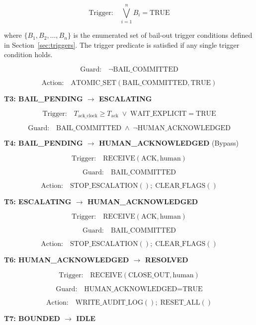 \[
\text{Trigger:} \quad \bigvee_{i=1}^{n} B_i = \text{TRUE}
\]

where $\{B_1, B_2, \ldots, B_n\}$ is the enumerated set of bail-out trigger conditions defined in Section~\ref{sec:triggers}. The trigger predicate is satisfied if any single trigger condition holds.

\[
\text{Guard:} \quad \neg\text{BAIL\_COMMITTED}
\]

\[
\text{Action:} \quad \text{ATOMIC\_SET}(\text{BAIL\_COMMITTED}, \text{TRUE})
\]

\bigskip

\noindent\textbf{T3: BAIL\_PENDING $\rightarrow$ ESCALATING}

\[
\text{Trigger:} \quad T_{\text{ack\_clock}} \geq T_{\text{ack}} \;\lor\; \text{WAIT\_EXPLICIT} = \text{TRUE}
\]

\[
\text{Guard:} \quad \text{BAIL\_COMMITTED} \;\land\; \neg\text{HUMAN\_ACKNOWLEDGED}
\]

\bigskip

\noindent\textbf{T4: BAIL\_PENDING $\rightarrow$ HUMAN\_ACKNOWLEDGED} (Bypass)

\[
\text{Trigger:} \quad \text{RECEIVE}(\text{ACK}, \text{human})
\]

\[
\text{Guard:} \quad \text{BAIL\_COMMITTED}
\]

\[
\text{Action:} \quad \text{STOP\_ESCALATION}(); \; \text{CLEAR\_FLAGS}()
\]

\bigskip

\noindent\textbf{T5: ESCALATING $\rightarrow$ HUMAN\_ACKNOWLEDGED}

\[
\text{Trigger:} \quad \text{RECEIVE}(\text{ACK}, \text{human})
\]

\[
\text{Guard:} \quad \text{BAIL\_COMMITTED}
\]

\[
\text{Action:} \quad \text{STOP\_ESCALATION}(); \; \text{CLEAR\_FLAGS}()
\]

\bigskip

\noindent\textbf{T6: HUMAN\_ACKNOWLEDGED $\rightarrow$ RESOLVED}

\[
\text{Trigger:} \quad \text{RECEIVE}(\text{CLOSE\_OUT}, \text{human})
\]

\[
\text{Guard:} \quad \text{HUMAN\_ACKNOWLEDGED} = \text{TRUE}
\]

\[
\text{Action:} \quad \text{WRITE\_AUDIT\_LOG}(); \; \text{RESET\_ALL}()
\]

\bigskip

\noindent\textbf{T7: BOUNDED $\rightarrow$ IDLE}

